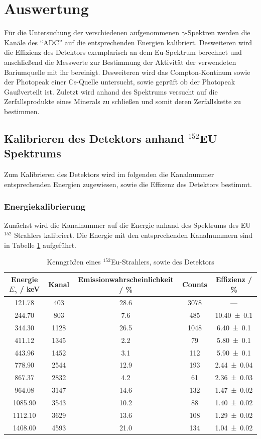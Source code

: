 \section{Auswertung}
\label{sec:Auswertung}
Für die Untersuchung der verschiedenen aufgenommenen $\gamma$-Spektren werden die Kanäle des ``ADC'' auf die entsprechenden Energien kalibriert. Desweiteren wird die Effizienz des Detektors exemplarisch an dem Eu-Spektrum berechnet und anschließend die Messwerte zur Bestimmung der Aktivität der verwendeten Bariumquelle mit ihr bereinigt. Desweiteren wird das Compton-Kontinum sowie der Photopeak einer Cs-Quelle untersucht, sowie geprüft ob der Photopeak Gaußverteilt ist. Zuletzt wird anhand des Spektrums versucht auf die Zerfallsprodukte eines Minerals zu schließen und somit deren Zerfallskette zu bestimmen.


\subsection{Kalibrieren des Detektors anhand $^{152}$EU Spektrums}
Zum Kalibrieren des Detektors wird im folgenden die Kanalnummer entsprechenden Energien zugewiesen, sowie die Effizenz des Detektors bestimmt.


\subsubsection{Energiekalibrierung}
\label{sec:Kalb}
Zunächst wird die Kanalnummer auf die Energie anhand des Spektrums des EU$^{152}$ Strahlers kalibriert. Die Energie mit den entsprechenden Kanalnummern sind in Tabelle \ref{tab:CsSpekt} aufgeführt.

\begin{table}
  \centering
  \caption{Kenngrößen eines $^{152}$Eu-Strahlers, sowie des Detektors}
  \begin{tabular}{c | c c c c}
    \toprule
    Energie $E_{\gamma}$ / keV& Kanal & Emissionwahrscheinlichkeit / \% & Counts & Effizienz / \% \\
    \hline
    121.78	& 403	& 28.6	& 3078 	& ---	\\
    244.70	& 803	& 7.6	& 485 	& \num{10.40 +- 0.1}	\\
    344.30	& 1128	& 26.5	& 1048	& \num{6.40 +- 0.1}	\\
    411.12	& 1345	& 2.2	& 79	& \num{5.80 +- 0.1}	\\
    443.96	& 1452	& 3.1	& 112 	& \num{5.90 +- 0.1}	\\
    778.90	& 2544	& 12.9	& 193	& \num{2.44 +- 0.04}	\\
    867.37	& 2832	& 4.2	& 61	& \num{2.36 +- 0.03}	\\
    964.08	& 3147	& 14.6	& 132	& \num{1.47 +- 0.02}	\\
    1085.90	& 3543	& 10.2	& 88	& \num{1.40 +- 0.02}	\\
    1112.10	& 3629	& 13.6	& 108	& \num{1.29 +- 0.02}	\\
    1408.00	& 4593	& 21.0 	& 134	& \num{1.04 +- 0.02}	\\
    \bottomrule
  \end{tabular}
  \label{tab:CsSpekt}
\end{table}

